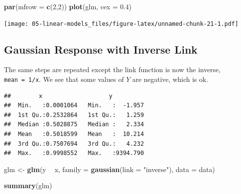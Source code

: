 \documentclass[openany]{book}
\newenvironment{Shaded}{\begin{snugshade}}{\end{snugshade}}
\newcommand{\ControlFlowTok}[1]{\textcolor[rgb]{0.13,0.29,0.53}{\textbf{#1}}}
\newcommand{\DataTypeTok}[1]{\textcolor[rgb]{0.13,0.29,0.53}{#1}}
\newcommand{\DecValTok}[1]{\textcolor[rgb]{0.00,0.00,0.81}{#1}}
\newcommand{\FloatTok}[1]{\textcolor[rgb]{0.00,0.00,0.81}{#1}}
\newcommand{\KeywordTok}[1]{\textcolor[rgb]{0.13,0.29,0.53}{\textbf{#1}}}
\newcommand{\NormalTok}[1]{#1}
\newcommand{\OperatorTok}[1]{\textcolor[rgb]{0.81,0.36,0.00}{\textbf{#1}}}
\newcommand{\StringTok}[1]{\textcolor[rgb]{0.31,0.60,0.02}{#1}}
\begin{document}
\begin{Shaded}
\begin{Highlighting}[]
\KeywordTok{par}\NormalTok{(}\DataTypeTok{mfrow =} \KeywordTok{c}\NormalTok{(}\DecValTok{2}\NormalTok{,}\DecValTok{2}\NormalTok{))}
\KeywordTok{plot}\NormalTok{(glm, }\DataTypeTok{cex =} \FloatTok{0.4}\NormalTok{)}
\end{Highlighting}
\end{Shaded}

\texttt{[image: 05-linear-models\_files/figure-latex/unnamed-chunk-21-1.pdf]}

\hypertarget{gaussian-response-with-inverse-link}{%
\subsection{Gaussian Response with Inverse Link}\label{gaussian-response-with-inverse-link}}

The same steps are repeated except the link function is now the inverse, \texttt{mean\ =\ 1/x}. We see that some values of \(Y\) are negative, which is ok.

\begin{Shaded}
\end{Shaded}

\begin{verbatim}
##        x                   y           
##  Min.   :0.0001064   Min.   :  -1.957  
##  1st Qu.:0.2532864   1st Qu.:   1.259  
##  Median :0.5028875   Median :   2.334  
##  Mean   :0.5018599   Mean   :  10.214  
##  3rd Qu.:0.7507694   3rd Qu.:   4.232  
##  Max.   :0.9998552   Max.   :9394.790
\end{verbatim}

\begin{Shaded}
\begin{Highlighting}[]
\NormalTok{glm <-}\StringTok{ }\KeywordTok{glm}\NormalTok{(y }\OperatorTok{~}\StringTok{ }\NormalTok{x, }\DataTypeTok{family =} \KeywordTok{gaussian}\NormalTok{(}\DataTypeTok{link =} \StringTok{"inverse"}\NormalTok{), }\DataTypeTok{data =}\NormalTok{ data)}

\KeywordTok{summary}\NormalTok{(glm)}
\end{Highlighting}
\end{Shaded}
\end{document}
